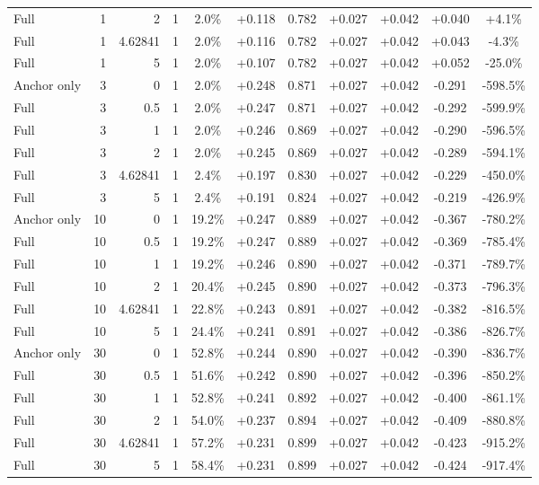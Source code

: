 \begin{table}[htbp]
\begin{tabular}{lrrrccccccc}
Full & 1 & 2 & 1 & 2.0\% & +0.118 & 0.782 & +0.027 & +0.042 & +0.040 & +4.1\% \\
Full & 1 & 4.62841 & 1 & 2.0\% & +0.116 & 0.782 & +0.027 & +0.042 & +0.043 & -4.3\% \\
Full & 1 & 5 & 1 & 2.0\% & +0.107 & 0.782 & +0.027 & +0.042 & +0.052 & -25.0\% \\
Anchor only & 3 & 0 & 1 & 2.0\% & +0.248 & 0.871 & +0.027 & +0.042 & -0.291 & -598.5\% \\
Full & 3 & 0.5 & 1 & 2.0\% & +0.247 & 0.871 & +0.027 & +0.042 & -0.292 & -599.9\% \\
Full & 3 & 1 & 1 & 2.0\% & +0.246 & 0.869 & +0.027 & +0.042 & -0.290 & -596.5\% \\
Full & 3 & 2 & 1 & 2.0\% & +0.245 & 0.869 & +0.027 & +0.042 & -0.289 & -594.1\% \\
Full & 3 & 4.62841 & 1 & 2.4\% & +0.197 & 0.830 & +0.027 & +0.042 & -0.229 & -450.0\% \\
Full & 3 & 5 & 1 & 2.4\% & +0.191 & 0.824 & +0.027 & +0.042 & -0.219 & -426.9\% \\
Anchor only & 10 & 0 & 1 & 19.2\% & +0.247 & 0.889 & +0.027 & +0.042 & -0.367 & -780.2\% \\
Full & 10 & 0.5 & 1 & 19.2\% & +0.247 & 0.889 & +0.027 & +0.042 & -0.369 & -785.4\% \\
Full & 10 & 1 & 1 & 19.2\% & +0.246 & 0.890 & +0.027 & +0.042 & -0.371 & -789.7\% \\
Full & 10 & 2 & 1 & 20.4\% & +0.245 & 0.890 & +0.027 & +0.042 & -0.373 & -796.3\% \\
Full & 10 & 4.62841 & 1 & 22.8\% & +0.243 & 0.891 & +0.027 & +0.042 & -0.382 & -816.5\% \\
Full & 10 & 5 & 1 & 24.4\% & +0.241 & 0.891 & +0.027 & +0.042 & -0.386 & -826.7\% \\
Anchor only & 30 & 0 & 1 & 52.8\% & +0.244 & 0.890 & +0.027 & +0.042 & -0.390 & -836.7\% \\
Full & 30 & 0.5 & 1 & 51.6\% & +0.242 & 0.890 & +0.027 & +0.042 & -0.396 & -850.2\% \\
Full & 30 & 1 & 1 & 52.8\% & +0.241 & 0.892 & +0.027 & +0.042 & -0.400 & -861.1\% \\
Full & 30 & 2 & 1 & 54.0\% & +0.237 & 0.894 & +0.027 & +0.042 & -0.409 & -880.8\% \\
Full & 30 & 4.62841 & 1 & 57.2\% & +0.231 & 0.899 & +0.027 & +0.042 & -0.423 & -915.2\% \\
Full & 30 & 5 & 1 & 58.4\% & +0.231 & 0.899 & +0.027 & +0.042 & -0.424 & -917.4\% \\

\end{tabular}
\end{table}
